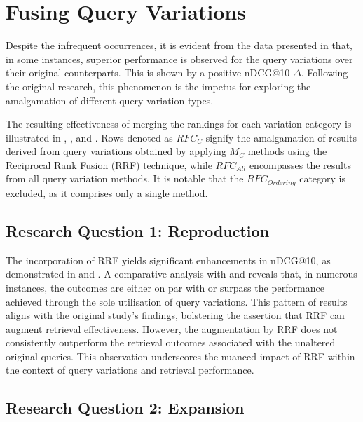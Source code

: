 \section{Fusing Query Variations}
Despite the infrequent occurrences, it is evident from the data presented in  that, in some instances, superior performance is observed for the query variations over their original counterparts. This is shown by a positive nDCG@10 $\Delta$. Following the original research, this phenomenon is the impetus for exploring the amalgamation of different query variation types.

The resulting effectiveness of merging the rankings for each variation category is illustrated in , , and . Rows denoted as $ RFC_C $ signify the amalgamation of results derived from query variations obtained by applying $ M_C $ methods using the Reciprocal Rank Fusion (RRF) technique, while $ RFC_{All} $ encompasses the results from all query variation methods. It is notable that the $ RFC_{Ordering} $ category is excluded, as it comprises only a single method.

\subsection{Research Question 1: Reproduction}


The incorporation of RRF yields significant enhancements in nDCG@10, as demonstrated in  and . A comparative analysis with  and  reveals that, in numerous instances, the outcomes are either on par with or surpass the performance achieved through the sole utilisation of query variations. This pattern of results aligns with the original study's findings, bolstering the assertion that RRF can augment retrieval effectiveness. However, the augmentation by RRF does not consistently outperform the retrieval outcomes associated with the unaltered original queries. This observation underscores the nuanced impact of RRF within the context of query variations and retrieval performance.

\subsection{Research Question 2: Expansion}


